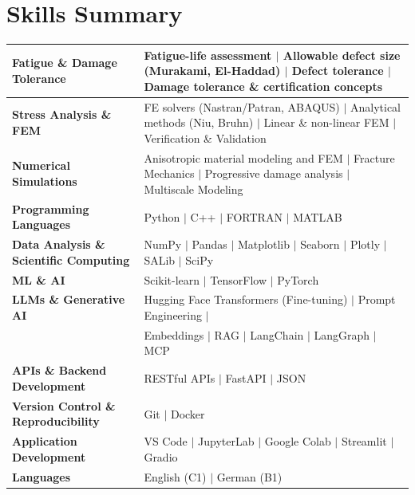 \documentclass[a4paper,20pt]{article}
\begin{document}
		



\renewcommand{\arraystretch}{1.3}
\section{\color{blue}Skills Summary}
\begin{tabular}{|p{8cm}p{10.5cm}|}

\hline
\textbf{Fatigue \& Damage Tolerance} &
Fatigue-life assessment \(\vert\) Allowable defect size (Murakami, El-Haddad) \(\vert\) Defect tolerance \(\vert\) Damage tolerance \& certification concepts \\

\hline
\textbf{Stress Analysis \& FEM} &
FE solvers (Nastran/Patran, ABAQUS) \(\vert\) Analytical methods (Niu, Bruhn) \(\vert\) Linear \& non-linear FEM \(\vert\) Verification \& Validation \\

\hline
\textbf{Numerical Simulations} &
Anisotropic material modeling and FEM  \(\vert\) Fracture Mechanics  \(\vert\) Progressive damage analysis \(\vert\) Multiscale Modeling \\

\hline
\textbf{ Programming Languages} &
Python  \(\vert\) C++ \(\vert\) FORTRAN \(\vert\) MATLAB \\
\hline

\textbf{ Data Analysis \& Scientific Computing} &
NumPy \(\vert\) Pandas \(\vert\) Matplotlib \(\vert\) Seaborn \(\vert\) Plotly \(\vert\) SALib \(\vert\) SciPy \\
\hline

\textbf{ ML \& AI} &
Scikit-learn \(\vert\) TensorFlow \(\vert\) PyTorch \\
\hline

\textbf{LLMs \& Generative AI} &
Hugging Face Transformers (Fine-tuning) \(\vert\) Prompt Engineering \(\vert\) \\ & Embeddings \(\vert\) RAG \(\vert\) LangChain \(\vert\) LangGraph \(\vert\) MCP \\

\hline

\textbf{ APIs \& Backend Development} &
RESTful APIs \(\vert\) FastAPI \(\vert\) JSON\\
\hline


\textbf{ Version Control \& Reproducibility} &
Git \(\vert\) Docker \\
\hline

\textbf{ Application Development} &
VS Code \(\vert\) JupyterLab \(\vert\) Google Colab \(\vert\) Streamlit \(\vert\) Gradio\\
\hline
\textbf{ Languages} &
English (C1) \(\vert\) German (B1) \\
\hline
\end{tabular}
\end{document}
